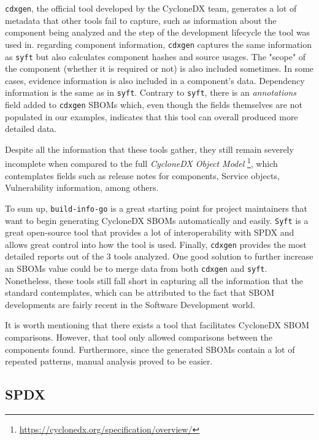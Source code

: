 \verb|cdxgen|, the official tool developed by the CycloneDX team, generates a lot of metadata that other tools fail to capture, such as information about the component being analyzed and the step of the development lifecycle the tool was used in. regarding component information, \verb|cdxgen| captures the same information as \verb|syft| but also calculates component hashes and source usages. The "scope" of the component (whether it is required or not) is also included sometimes. In some cases, evidence information is also included in a component's data. Dependency information is the same as in \verb|syft|. Contrary to \verb|syft|, there is an \textit{annotations} field added to \verb|cdxgen| SBOMs which, even though the fields themselves are not populated in our examples, indicates that this tool can overall produced more detailed data.

Despite all the information that these tools gather, they still remain severely incomplete when compared to the full \emph{CycloneDX Object Model} \footnote{\href{https://cyclonedx.org/specification/overview/}{https://cyclonedx.org/specification/overview/}}, which contemplates fields such as release notes for components, Service objects, Vulnerability information, among others.

To sum up, \verb|build-info-go| is a great starting point for project maintainers that want to begin generating CycloneDX SBOMs automatically and easily. \verb|Syft| is a great open-source tool that provides a lot of interoperability with SPDX and allows great control into how the tool is used. Finally, \verb|cdxgen| provides the most detailed reports out of the 3 tools analyzed. One good solution to further increase an SBOMs value could be to merge data from both \verb|cdxgen| and \verb|syft|. Nonetheless, these tools still fall short in capturing all the information that the standard contemplates, which can be attributed to the fact that SBOM developments are fairly recent in the Software Development world.

It is worth mentioning that there exists a tool that facilitates CycloneDX SBOM comparisons. However, that tool only allowed comparisons between the components found. Furthermore, since the generated SBOMs contain a lot of repeated patterns, manual analysis proved to be easier.

\subsection{SPDX} \label{results:spdx}

